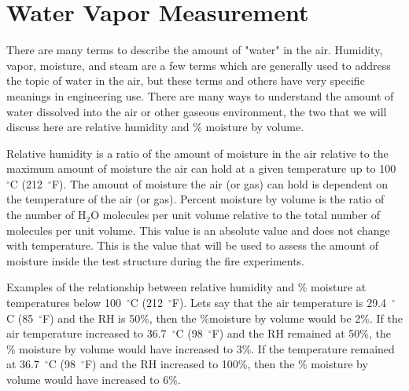 \documentclass[12pt,oneside]{book}
\begin{document}




\section{Water Vapor Measurement}
There are many terms to describe the amount of "water" in the air.  Humidity, vapor, moisture, and steam are a few terms which are generally used to address the topic of water in the air, but these terms and others have very specific meanings in engineering use.  There are many ways to understand the amount of water dissolved into the air or other gaseous environment, the two that we will discuss here are relative humidity and \% moisture by volume.  

Relative humidity is a ratio of the amount of moisture in the air relative to the maximum amount of moisture the air can hold at a given temperature up to 100~$^\circ$C (212~$^\circ$F).  The amount of moisture the air (or gas) can hold is dependent on the temperature of the air (or gas).  Percent moisture by volume is the ratio of the number of H$_{2}$O molecules per unit volume relative to the total number of molecules per unit volume.  This value is an absolute value and does not change with temperature.  This is the value that will be used to assess the amount of moisture inside the test structure during the fire experiments.  

Examples of the relationship between relative humidity and \% moisture at temperatures below 100~$^\circ$C (212~$^\circ$F).  Lets say that the air temperature is 29.4~$^\circ$C (85~$^\circ$F) and the RH is 50\%, then the \%moisture by volume would be 2\%.   If the air temperature increased to 36.7~$^\circ$C (98~$^\circ$F) and the RH remained at 50\%, the \% moisture by volume would have increased to 3\%.  If the temperature remained at 36.7~$^\circ$C (98~$^\circ$F) and the RH increased to 100\%, then the \% moisture by volume would have increased to 6\%. 
\end{document}
